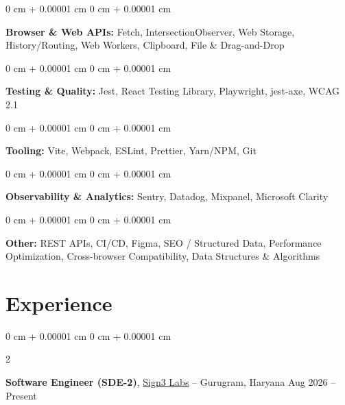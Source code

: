 \documentclass[10pt, letterpaper]{article}
\newenvironment{onecolentry}{
    \begin{adjustwidth}{
        0 cm + 0.00001 cm
    }{
        0 cm + 0.00001 cm
    }
}{
    \end{adjustwidth}
} %
\newenvironment{twocolentry}[2][]{
    \onecolentry
    \def\secondColumn{#2}
    \setcolumnwidth{\fill, 4.5 cm}
    \begin{paracol}{2}
}{
    \switchcolumn \raggedleft \secondColumn
    \end{paracol}
    \endonecolentry
} %
\let\hrefWithoutArrow\href
\begin{document}
        \vspace{0.2 cm}

        \begin{onecolentry}
            \textbf{Browser \& Web APIs:} Fetch, IntersectionObserver, Web Storage, History/Routing, Web Workers, Clipboard, File \& Drag-and-Drop
        \end{onecolentry}

        \vspace{0.2 cm}

        \begin{onecolentry}
            \textbf{Testing \& Quality:} Jest, React Testing Library, Playwright, jest-axe, WCAG 2.1
        \end{onecolentry}

        \vspace{0.2 cm}

        \begin{onecolentry}
            \textbf{Tooling:} Vite, Webpack, ESLint, Prettier, Yarn/NPM, Git
        \end{onecolentry}

        \vspace{0.2 cm}

        \begin{onecolentry}
            \textbf{Observability \& Analytics:} Sentry, Datadog, Mixpanel, Microsoft Clarity
        \end{onecolentry}

        \vspace{0.2 cm}

        \begin{onecolentry}
            \textbf{Other:} REST APIs, CI/CD, Figma, SEO / Structured Data, Performance Optimization, Cross-browser Compatibility, Data Structures \& Algorithms
        \end{onecolentry}

        \vspace{0.2 cm}


     \section{Experience}



        \vspace{0.30 cm}
        \begin{twocolentry}{
            Aug 2026 – Present
        }
            \textbf{Software Engineer (SDE-2)}, \hrefWithoutArrow{https://sign3.ai/}{Sign3 Labs} -- Gurugram, Haryana\end{twocolentry}
\end{document}

